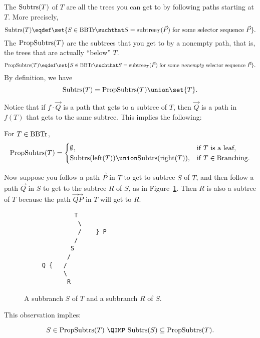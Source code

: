 \medskip
The  $\text{Subtrs}(T)$ of $T$ are all the trees you can get
to by following paths starting at $T$.  More precisely,
\[
\subbrn{T} \eqdef \set{S \in \brnch \suchthat S =
  \rslt{T}{(\vec{P})}\ \text{for some selector sequence}\ \vec{P}}.
\]
The  $\text{PropSubtrs}(T)$ are the subtrees that you get
to by a nonempty path, that is, the trees that are actually ``below''
$T$.
\[
\propbrn{T} \eqdef \set{S \in \brnch \suchthat S =
  \rslt{T}{(\vec{P})}\ \text{for some \emph{nonempty} selector
    sequence}\ \vec{P}}.
\]
By definition, we have
\[
\subbrn{T} = \propbrn{T} \union \set{T}.
\]

Notice that if $f \cdot \vec{Q}$ is a path that gets to a subtree of
$T$, then $\vec{Q}$ is a path in $f(T)$ that gets to the same subtree.
This implies the following:
\begin{corollary}\label{unionLR}
For $T \in \text{BBTr}$,
\[
\propbrn{T} =
\begin{cases}
  \emptyset, & \text{if $T$ is a leaf},\\
  \subbrn{\leftsub{(T)}} \union \subbrn{\rightsub{(T)}},
            & \text{if}\ T \in \brnchng.
\end{cases}
\]
\end{corollary}

Now suppose you follow a path $\vec{P}$ in $T$ to get to subtree $S$
of $T$, and then follow a path $\vec{Q}$ in $S$ to get to the subtree
$R$ of $S$, as in Figure~\ref{PQdown}.  Then $R$ is also a subtree of
$T$ because the path $\vec{Q}\vec{P}$ in $T$ will get to $R$.

\begin{figure}


\begin{center}
\begin{verbatim}
              T
               \
               /    } P
              /
             S
            /
     Q {   /
           \
            R
\end{verbatim}   
\end{center}

\caption{A subbranch $S$ of $T$ and  a subbranch $R$ of $S$.}

\label{PQdown}

\end{figure}

This observation implies:
\begin{corollary}\label{propsubbranch}
\[
 S \in \propbrn{T}\ \QIMP\ \subbrn{S} \subseteq \propbrn{T}.
\]
\end{corollary}


